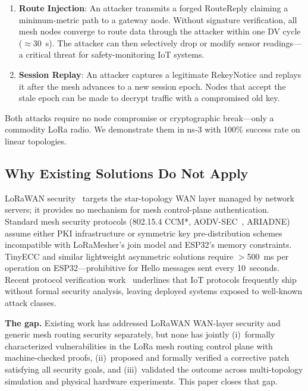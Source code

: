 \documentclass[10pt,journal,compsoc]{IEEEtran}
\begin{document}
\begin{enumerate}
  \item \textbf{Route Injection}: An attacker transmits a forged
    RouteReply claiming a minimum-metric path to a gateway node.
    Without signature verification, all mesh nodes converge to
    route data through the attacker within one DV cycle ($\approx$30~s).
    The attacker can then selectively drop or modify sensor readings—
    a critical threat for safety-monitoring IoT systems.

  \item \textbf{Session Replay}: An attacker captures a legitimate
    RekeyNotice and replays it after the mesh advances to a new
    session epoch. Nodes that accept the stale epoch can be made
    to decrypt traffic with a compromised old key.
\end{enumerate}

Both attacks require no node compromise or cryptographic break—only
a commodity LoRa radio. We demonstrate them in ns-3 with 100\%
success rate on linear topologies.

\subsection{Why Existing Solutions Do Not Apply}

LoRaWAN security~\cite{ieee2025-lorawan-key-vulnerability,ieee2025-lorawan-key-verification,mohamed2022-lorawan-gateways}
targets the star-topology WAN layer managed by network servers;
it provides no mechanism for mesh control-plane authentication.
Standard mesh security protocols (802.15.4 CCM*, AODV-SEC~\cite{hu2002-sead},
ARIADNE) assume either PKI infrastructure or symmetric key
pre-distribution schemes incompatible with LoRaMesher's join model
and ESP32's memory constraints. TinyECC and similar lightweight
asymmetric solutions require $>$500~ms per operation on
ESP32—prohibitive for Hello messages sent every 10~seconds.
Recent protocol verification work~\cite{duttagupta2025-matter-security,casagrande2025-iot-protocol-attacks}
underlines that IoT protocols frequently ship without formal
security analysis, leaving deployed systems exposed to
well-known attack classes.

\textbf{The gap.} Existing work has addressed LoRaWAN WAN-layer
security and generic mesh routing security separately, but none has
jointly (i)~formally characterized vulnerabilities in the LoRa mesh
routing control plane with machine-checked proofs, (ii)~proposed
and formally verified a corrective patch satisfying all security
goals, and (iii)~validated the outcome across multi-topology
simulation and physical hardware experiments. This paper closes
that gap.
\end{document}

